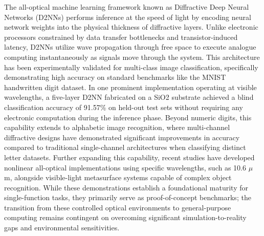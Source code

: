 \documentclass[11pt]{article}
\begin{document}
The all-optical machine learning framework known as Diffractive Deep Neural Networks (D2NNs) performs inference at the speed of light by encoding neural network weights into the physical thickness of diffractive layers. \citep{doi_10_1021_acsphotonics_4c01284_s001_10346917} Unlike electronic processors constrained by data transfer bottlenecks and transistor-induced latency, D2NNs utilize wave propagation through free space to execute analogue computing instantaneously as signals move through the system. This architecture has been experimentally validated for multi-class image classification, specifically demonstrating high accuracy on standard benchmarks like the MNIST handwritten digit dataset. In one prominent implementation operating at visible wavelengths, a five-layer D2NN fabricated on a SiO2 substrate achieved a blind classification accuracy of 91.57\% on held-out test sets without requiring any electronic computation during the inference phase. Beyond numeric digits, this capability extends to alphabetic image recognition, where multi-channel diffractive designs have demonstrated significant improvements in accuracy compared to traditional single-channel architectures when classifying distinct letter datasets. Further expanding this capability, recent studies have developed nonlinear all-optical implementations using specific wavelengths, such as 10.6 \(\mu\) m, alongside visible-light metasurface systems capable of complex object recognition. While these demonstrations establish a foundational maturity for single-function tasks, they primarily serve as proof-of-concept benchmarks; the transition from these controlled optical environments to general-purpose computing remains contingent on overcoming significant simulation-to-reality gaps and environmental sensitivities. \citep{doi_10_54097_hset_v24i_3957_e6f20e8a} \citep{doi_10_1016_j_eng_2020_07_032_6e23cd05} \citep{doi_10_1155_2021_6667495_60f04b14} \citep{doi_10_1109_piers53385_2021_9694760_15b5fd61}
\end{document}
